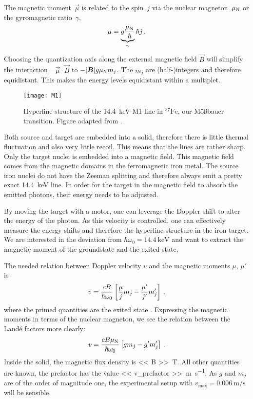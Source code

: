 \documentclass[11pt, english, fleqn, DIV=15, headinclude, BCOR=2cm]{scrreprt}
\begin{document}
The magnetic moment~$\vec \mu$ is related to the spin~$j$ via the nuclear
magneton~$\mu_\text N$ or the gyromagnetic ratio~$\gamma$,
\[
    \mu = \underbrace{g \frac{\mu_\text N}{\hbar}}_{\gamma} \hbar j \,.
\]
Choosing the quantization axis along the external magnetic field $\vec B$ will
simplify the interaction $- \vec \mu \cdot \vec B$ to $- |\vec B| g \mu_\text N
m_j$. The $m_j$ are (half-)integers and therefore equidistant. This makes the
energy levels equidistant within a multiplet.

\begin{figure}
    \centering
    \texttt{[image: M1]}
    \caption{%
        Hyperfine structure of the \SI{14.4}{\kilo\electronvolt}-M1-line in
        $^{57}\mathrm{Fe}$, our Mößbauer transition.
        Figure adapted from
        \textcite[Fig.~4.22]{Schatz/Nukleare_Festkoerperphysik}.
    }
    \label{fig:M1}
\end{figure}

Both source and target are embedded into a solid, therefore there is little
thermal fluctuation and also very little recoil. This means that the lines are
rather sharp. Only the target nuclei is embedded into a magnetic field. This
magnetic field comes from the magnetic domains in the ferromagnetic iron metal.
The source iron nuclei do not have the Zeeman splitting and therefore always
emit a pretty exact \SI{14.4}{\kilo\electronvolt} line. In order for the target
in the magnetic field to absorb the emitted photons, their energy needs to be
adjusted.

By moving the target with a motor, one can leverage the Doppler shift to alter
the energy of the photon. As this velocity is controlled, one can effectively
measure the energy shifts and therefore the hyperfine structure in the iron
target. We are interested in the deviation from $\hbar \omega_0 =
\SI{14.4}{\kilo\electronvolt}$ and want to extract the magnetic moment of the
groundstate and the exited state.

The needed relation between Doppler velocity $v$ and the magnetic moments
$\mu$, $\mu'$ is
\[
    v = \frac{c B}{\hbar \omega_0}
    \left[ \frac{\mu}{j} m_j - \frac{\mu'}{j'} m_j' \right]
    \,,
\]
where the primed quantities are the exited state
\parencite[(4.42)]{Schatz/Nukleare_Festkoerperphysik}. Expressing the magnetic
moments in terms of the nuclear magneton, we see the relation between the Landé
factors more clearly:
\begin{equation}
    \label{eq:velocity}
    v = \frac{c B \mu_\text N}{\hbar \omega_0} \left[ g m_j - g' m_j' \right] \,.
\end{equation}
Inside the solid, the magnetic flux density is \SI{<< B >>}{\tesla}. All other
quantities are known,
the prefactor has the value \SI{<< v_prefactor >>}{\meter\per\second}. As $g$
and $m_j$ are of the order of magnitude one, the experimental setup with
$v_\text{max} = \SI{0.006}{\meter\per\second}$ will be sensible.
\end{document}

